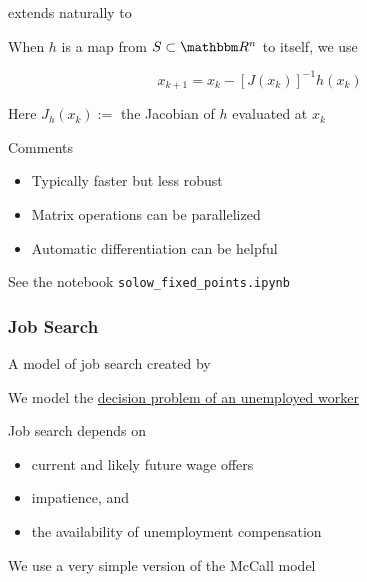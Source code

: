 \begin{frame}
    
     extends naturally to 

            \vspace{0.5em}
    When $h$ is a map from $S \subset \RR^n$ to itself, we use

    \begin{equation*}
        x_{k+1} = x_k - [J(x_k)]^{-1} h(x_k)
    \end{equation*}

    Here $J_h(x_k) := $ the Jacobian of $h$ evaluated at $x_k$

    \vspace{1em}

    Comments
    \begin{itemize}
        \item Typically faster but less robust
            \vspace{0.5em}
        \item Matrix operations can be parallelized
            \vspace{0.5em}
        \item Automatic differentiation can be helpful
    \end{itemize}



\end{frame}


\begin{frame}
    
    See the notebook \texttt{solow\_fixed\_points.ipynb}

\end{frame}



\begin{frame}
    \frametitle{Job Search}

    A model of job search created by 
    \vspace{0.5em}

    We model the \underline{decision problem of an unemployed worker}

    \vspace{0.5em}
    Job search depends on
    \begin{itemize}
        \item current and likely future wage offers
    \vspace{0.5em}
        \item impatience, and
    \vspace{0.5em}
        \item the availability of unemployment compensation
    \end{itemize}

    \vspace{0.5em}
    We use a very simple version of the McCall model 

\end{frame}


